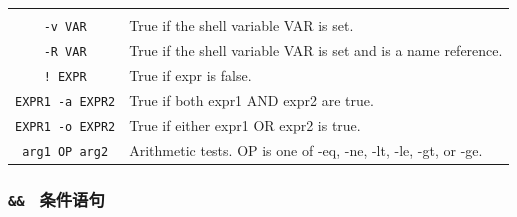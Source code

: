\documentclass[doctor,openright,twoside]{sjtuthesis}
\newcommand{\passthrough}[1]{#1}
\theoremstyle{plain}
\theoremstyle{definition}
\theoremstyle{remark}
\theoremstyle{ocrenumbox}
\theoremstyle{plain}
\begin{document}
\begin{longtable}[]{@{}cl@{}}
\begin{minipage}[t]{0.74\columnwidth}
\end{minipage}\tabularnewline
\begin{minipage}[t]{0.20\columnwidth}\centering
\passthrough{\lstinline!-v VAR!}\strut
\end{minipage} & \begin{minipage}[t]{0.74\columnwidth}\raggedright
True if the shell variable VAR is set.\strut
\end{minipage}\tabularnewline
\begin{minipage}[t]{0.20\columnwidth}\centering
\passthrough{\lstinline!-R VAR!}\strut
\end{minipage} & \begin{minipage}[t]{0.74\columnwidth}\raggedright
True if the shell variable VAR is set and is a name reference.\strut
\end{minipage}\tabularnewline
\begin{minipage}[t]{0.20\columnwidth}\centering
\passthrough{\lstinline"! EXPR"}\strut
\end{minipage} & \begin{minipage}[t]{0.74\columnwidth}\raggedright
True if expr is false.\strut
\end{minipage}\tabularnewline
\begin{minipage}[t]{0.20\columnwidth}\centering
\passthrough{\lstinline!EXPR1 -a EXPR2!}\strut
\end{minipage} & \begin{minipage}[t]{0.74\columnwidth}\raggedright
True if both expr1 AND expr2 are true.\strut
\end{minipage}\tabularnewline
\begin{minipage}[t]{0.20\columnwidth}\centering
\passthrough{\lstinline!EXPR1 -o EXPR2!}\strut
\end{minipage} & \begin{minipage}[t]{0.74\columnwidth}\raggedright
True if either expr1 OR expr2 is true.\strut
\end{minipage}\tabularnewline
\begin{minipage}[t]{0.20\columnwidth}\centering
\passthrough{\lstinline!arg1 OP arg2!}\strut
\end{minipage} & \begin{minipage}[t]{0.74\columnwidth}\raggedright
Arithmetic tests. OP is one of -eq, -ne, -lt, -le, -gt, or -ge.\strut
\end{minipage}\tabularnewline
\bottomrule
\end{longtable}

\hypertarget{section-108}{%
\subsubsection{\texorpdfstring{\texttt{\&\&\ \textbar{}\textbar{}} 条件语句}{\&\& \textbar\textbar{} 条件语句}}\label{section-108}}
\end{document}
